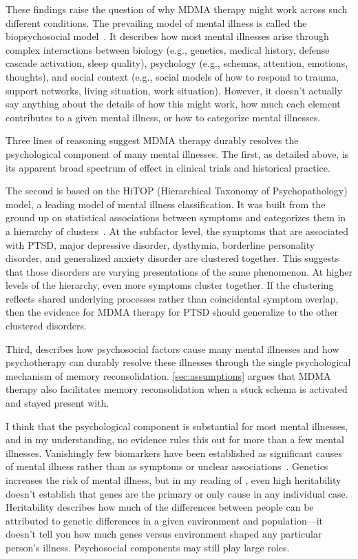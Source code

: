 \documentclass[11pt,oneside]{book}
\let\cite\parencite
\begin{document}
These findings raise the question of why MDMA therapy might work across such different conditions. The prevailing model of mental illness is called the biopsychosocial model~\cite{engel1977need}. It describes how most mental illnesses arise through complex interactions between biology (e.g., genetics, medical history, defense cascade activation, sleep quality), psychology (e.g., schemas, attention, emotions, thoughts), and social context (e.g., social models of how to respond to trauma, support networks, living situation, work situation). However, it doesn't actually say anything about the details of how this might work, how much each element contributes to a given mental illness, or how to categorize mental illnesses.

Three lines of reasoning suggest MDMA therapy durably resolves the psychological component of many mental illnesses. The first, as detailed above, is its apparent broad spectrum of effect in clinical trials and historical practice.

The second is based on the HiTOP (Hierarchical Taxonomy of Psychopathology) model, a leading model of mental illness classification. It was built from the ground up on statistical associations between symptoms and categorizes them in a hierarchy of clusters~\cite{kotov2017hierarchical}. At the subfactor level, the symptoms that are associated with PTSD, major depressive disorder, dysthymia, borderline personality disorder, and generalized anxiety disorder are clustered together. This suggests that those disorders are varying presentations of the same phenomenon. At higher levels of the hierarchy, even more symptoms cluster together. If the clustering reflects shared underlying processes rather than coincidental symptom overlap, then the evidence for MDMA therapy for PTSD should generalize to the other clustered disorders.

Third, \textcite{eckerUnlocking} describes how psychosocial factors cause many mental illnesses and how psychotherapy can durably resolve these illnesses through the single psychological mechanism of memory reconsolidation. \cref{sec:assumptions} argues that MDMA therapy also facilitates memory reconsolidation when a stuck schema is activated and stayed present with.

I think that the psychological component is substantial for most mental illnesses, and in my understanding, no evidence rules this out for more than a few mental illnesses. Vanishingly few biomarkers have been established as significant causes of mental illness rather than as symptoms or unclear associations~\cite{carvalhoBiomarker}. Genetics increases the risk of mental illness, but in my reading of \textcite{aftabGenetics,alexanderHeritability1,alexanderHeritability2}, even high heritability doesn't establish that genes are the primary or only cause in any individual case. Heritability describes how much of the differences between people can be attributed to genetic differences in a given environment and population---it doesn't tell you how much genes versus environment shaped any particular person's illness. Psychosocial components may still play large roles.
\end{document}
